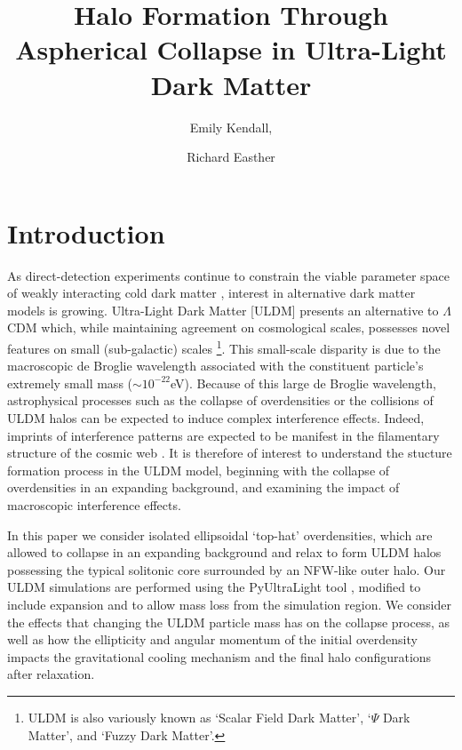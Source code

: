 \documentclass[a4paper,11pt]{article}
\title{\boldmath Halo Formation Through Aspherical Collapse in Ultra-Light Dark Matter}
\author[a]{Emily Kendall,}
\author[a]{Richard Easther}
\affiliation[a]{The University of Auckland, Private Bag 92019\\
Auckland 1142, New Zealand}
\begin{document}
\maketitle
\flushbottom

\section{Introduction}
\label{sec:intro}


As direct-detection experiments continue to constrain the viable parameter space of weakly interacting cold dark matter \cite{Schumann:2019eaa}, interest in alternative dark matter models is growing. Ultra-Light Dark Matter [ULDM] presents an alternative to $\Lambda$CDM which, while maintaining agreement on cosmological scales, possesses novel features on small (sub-galactic) scales \cite{Hui:2016ltb}\footnote{ULDM is also variously known as `Scalar Field Dark Matter', `$\Psi$ Dark Matter', and `Fuzzy Dark Matter'.}. This small-scale disparity is due to the macroscopic de Broglie wavelength associated with the constituent particle's extremely small mass ($\sim10^{-22}$eV). Because of this large de Broglie wavelength, astrophysical processes such as the collapse of overdensities or the collisions of ULDM halos can be expected to induce complex interference effects. Indeed, imprints of interference patterns are expected to be manifest in the filamentary structure of the cosmic web \cite{Mocz:2019emo}. It is therefore of interest to understand the stucture formation process in the ULDM model, beginning with the collapse of overdensities in an expanding background, and examining the impact of macroscopic interference effects. 

In this paper we consider isolated ellipsoidal `top-hat' overdensities, which are allowed to collapse in an expanding background and relax to form ULDM halos possessing the typical solitonic core surrounded by an NFW-like outer halo. Our ULDM simulations are performed using the {\sc PyUltraLight} tool \cite{Edwards:2018ccc}, modified to include expansion and to allow mass loss from the simulation region. We consider the effects that changing the ULDM particle mass has on the collapse process, as well as how the ellipticity and angular momentum of the initial overdensity impacts the gravitational cooling mechanism and the final halo configurations after relaxation. 
\end{document}
